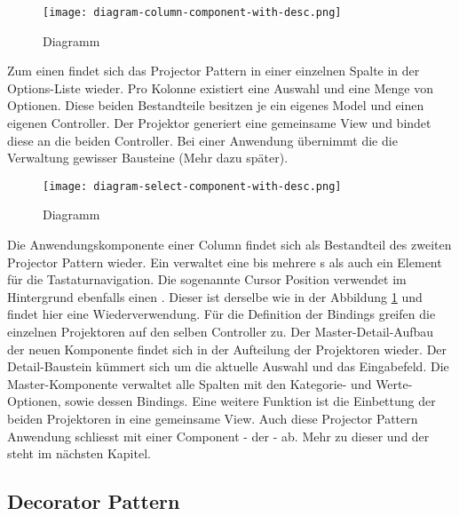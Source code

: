 \begin{figure}[!htb] %
    \centering
    \texttt{[image: diagram-column-component-with-desc.png]}
    \caption{Diagramm }
    \label{img:diagramColumnComponent}
\end{figure}

Zum einen findet sich das Projector Pattern in einer einzelnen Spalte in der Options-Liste wieder.
Pro Kolonne existiert eine Auswahl und eine Menge von Optionen.
Diese beiden Bestandteile besitzen je ein eigenes Model und einen eigenen Controller.
Der Projektor generiert eine gemeinsame View und bindet diese an die beiden Controller.
Bei einer Anwendung übernimmt die  die Verwaltung gewisser Bausteine (Mehr dazu später).

\begin{figure}[!htb]
    \centering
    \texttt{[image: diagram-select-component-with-desc.png]}
    \caption{Diagramm }
    \label{img:diagramSelectComponent}
\end{figure}

Die Anwendungskomponente einer Column findet sich als Bestandteil des zweiten Projector Pattern wieder.
Ein  verwaltet eine bis mehrere s als auch ein Element für die Tastaturnavigation.
Die sogenannte Cursor Position verwendet im Hintergrund ebenfalls einen . 
Dieser ist derselbe wie in der Abbildung \ref{img:diagramColumnComponent} und findet hier eine Wiederverwendung.
Für die Definition der Bindings greifen die einzelnen Projektoren auf den selben Controller zu.
Der Master-Detail-Aufbau der neuen Komponente findet sich in der Aufteilung der Projektoren wieder.
Der Detail-Baustein kümmert sich um die aktuelle Auswahl und das Eingabefeld.
Die Master-Komponente verwaltet alle Spalten mit den Kategorie- und Werte-Optionen, sowie dessen Bindings.
Eine weitere Funktion ist die Einbettung der beiden Projektoren in eine gemeinsame View.
Auch diese Projector Pattern Anwendung schliesst mit einer Component - der  - ab.
Mehr zu dieser und der  steht im nächsten Kapitel.


\subsection{Decorator Pattern}
\label{sec:decoratorPattern}

